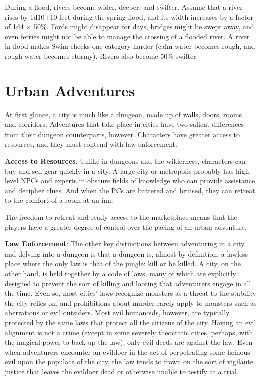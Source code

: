 During a flood, rivers become wider, deeper, and swifter. Assume that a river rises by 1d10+10 feet during the spring flood, and its width increases by a factor of 1d4 \mbox{$\times$} 50\%. Fords might disappear for days, bridges might be swept away, and even ferries might not be able to manage the crossing of a flooded river. A river in flood makes Swim checks one category harder (calm water becomes rough, and rough water becomes stormy). Rivers also become 50\% swifter.
				
\section{Urban Adventures}

				
At first glance, a city is much like a dungeon, made up of walls, doors, rooms, and corridors. Adventures that take place in cities have two salient differences from their dungeon counterparts, however. Characters have greater access to resources, and they must contend with law enforcement.
				
\textbf{Access to Resources}: Unlike in dungeons and the wilderness, characters can buy and sell gear quickly in a city. A large city or metropolis probably has high-level NPCs and experts in obscure fields of knowledge who can provide assistance and decipher clues. And when the PCs are battered and bruised, they can retreat to the comfort of a room at an inn.
				
The freedom to retreat and ready access to the marketplace means that the players have a greater degree of control over the pacing of an urban adventure.
				
\textbf{ Law Enforcement}: The other key distinctions between adventuring in a city and delving into a dungeon is that a dungeon is, almost by definition, a lawless place where the only law is that of the jungle: kill or be killed. A city, on the other hand, is held together by a code of laws, many of which are explicitly designed to prevent the sort of killing and looting that adventurers engage in all the time. Even so, most cities' laws recognize monsters as a threat to the stability the city relies on, and prohibitions about murder rarely apply to monsters such as aberrations or evil outsiders. Most evil humanoids, however, are typically protected by the same laws that protect all the citizens of the city. Having an evil alignment is not a crime (except in some severely theocratic cities, perhaps, with the magical power to back up the law); only evil deeds are against the law. Even when adventurers encounter an evildoer in the act of perpetrating some heinous evil upon the populace of the city, the law tends to frown on the sort of vigilante justice that leaves the evildoer dead or otherwise unable to testify at a trial.
				
